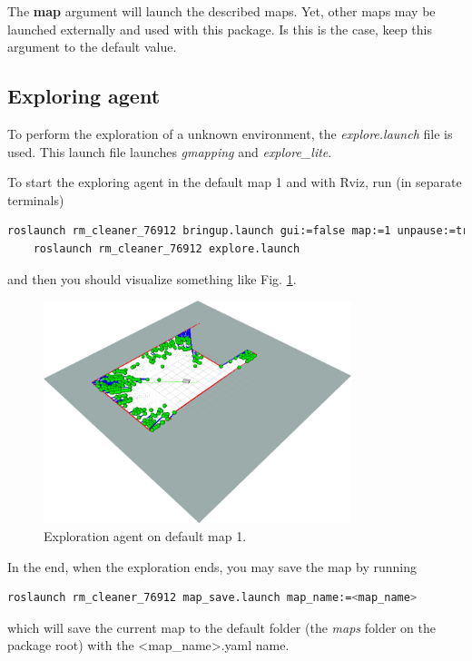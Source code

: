 \documentclass[]{article}
\begin{document}
The \textbf{map} argument will launch the described maps. Yet, other maps may be launched externally and used with this package. Is this is the case, keep this argument to the default value.

\subsection{Exploring agent}

To perform the exploration of a unknown environment, the \textit{explore.launch} file is used. This launch file launches \textit{gmapping} and \textit{explore\_lite}.

To start the exploring agent in the default map 1 and with Rviz, run (in separate terminals)
%
\begin{lstlisting}[language=bash]
    roslaunch rm_cleaner_76912 bringup.launch gui:=false map:=1 unpause:=true rviz:=true
    roslaunch rm_cleaner_76912 explore.launch
\end{lstlisting}
%
and then you should visualize something like Fig. \ref{fig:explore_agent}.

\begin{figure}[ht]
    \centering
    \includegraphics[width=0.8\textwidth]{imgs/explore_agent.png}
    \caption{Exploration agent on default map 1.}
    \label{fig:explore_agent}
\end{figure}

In the end, when the exploration ends, you may save the map by running 
%
\begin{lstlisting}[language=bash]
    roslaunch rm_cleaner_76912 map_save.launch map_name:=<map_name>
\end{lstlisting}
%
which will save the current map to the default folder (the \textit{maps} folder on the package root) with the \textless map\_name\textgreater.yaml name. 
\end{document}
